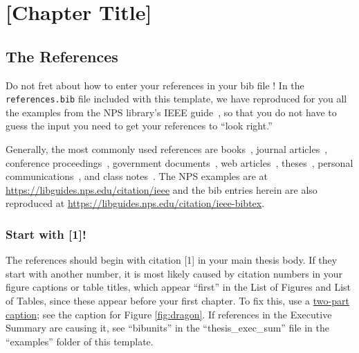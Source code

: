 \chapter{[Chapter Title]}\label{ch:labelhere}


\section{The References}\label{sec:hello}
Do not fret about how to enter your references in your bib file \cite{pollan_2006}! In the {\tt references.bib} file included with this template, we have reproduced for you all the examples from the NPS library's IEEE guide~\cite{pollan_2006,locke_2020,strindberg_warn_2011,haynes_2009,krishnan_2008,Crabtree:Chaplin:2013,abramowitz_64,orend_2013,bonds_2014,myer_77,
Houston:2016,comprehensive_2005,katz_2007,Teplin:EtAl:2005,morentz_2009,Suro:2004,nsa_ipac_2012,Blanche:2006,DOD.8570.01-M,JP-3-01,sniper_2011,erwin_2011,takai_2013,merriam_2017,FLSA:2008,transmission_comm_85,TSP-168:1972,sanico_2018,Griffin:2009,congress_1991,americans_1991,google_2017,linguine_2016,Beforebad:2014,bell_1876,Wunkerbunk:2002,dixon_2017,Wonka:1972,standard_1968,Nekeip:2008,Yoshi:1988,Horse:1996,Horse:1995,Sushi:1995,Python:2017,FBI_2017,Janes_2017,wiki_2016,sushi_2021,youtube_2014}, so that you do not have to guess the input you need to get your references to ``look right.'' 

Generally, the most commonly used references are
   books~\cite{pollan_2006,strindberg_warn_2011,haynes_2009,krishnan_2008,abramowitz_64,orend_2013,bonds_2014},
   journal articles~\cite{Griffin:2009,sanico_2018},
   conference proceedings~\cite{katz_2007,Teplin:EtAl:2005,morentz_2009},
   government documents~\cite{DOD.8570.01-M,JP-3-01,sniper_2011,erwin_2011},
   web articles~\cite{Sushi:1995,Python:2017,FBI_2017,Janes_2017},
   theses~\cite{Nekeip:2008},
   personal communications~\cite{Wunkerbunk:2002}, and
   class notes~\cite{Houston:2016}.
   The NPS examples are at \url{https://libguides.nps.edu/citation/ieee} and the  bib entries herein are also reproduced at \url{https://libguides.nps.edu/citation/ieee-bibtex}.


\subsection{Start with [1]!}\label{sec:firstone}
The references should begin with citation [1] in your main thesis body. If they start with another number, it is most likely caused by citation numbers in your figure captions or table titles, which appear ``first'' in the List of Figures and List of Tables, since these appear before your first chapter. To fix this, use a \underline{two-part caption}; see the caption for Figure \ref{fig:dragon}. If references in the Executive Summary are causing it, see ``bibunits'' in the ``thesis\_exec\_sum'' file in the ``examples'' folder of this template.

